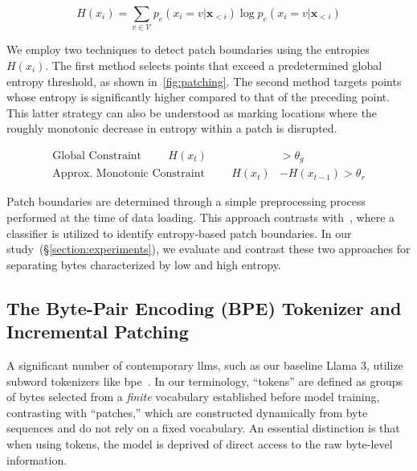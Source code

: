 \begin{equation}
H(x_i) = \sum_{v \in \mathcal{V}} p_{e}(x_i=v|\pmb{x}_{<i}) \log p_{e}(x_i=v|\pmb{x}_{<i})
\end{equation}

We employ two techniques to detect patch boundaries using the entropies $H(x_i)$. The first method selects points that exceed a predetermined global entropy threshold, as shown in~\autoref{fig:patching}. The second method targets points whose entropy is significantly higher compared to that of the preceding point. This latter strategy can also be understood as marking locations where the roughly monotonic decrease in entropy within a patch is disrupted.

\begin{align*}
    \text{Global Constraint}\hspace{1cm}H(x_t)& > \theta_g\\
    \text{Approx. Monotonic Constraint}\hspace{1cm}H(x_t)& - H(x_{t-1}) > \theta_r
\end{align*}

Patch boundaries are determined through a simple preprocessing process performed at the time of data loading. This approach contrasts with~\citet{nawrot-etal-2023-efficient}, where a classifier is utilized to identify entropy-based patch boundaries. In our study~(\S\ref{section:experiments}), we evaluate and contrast these two approaches for separating bytes characterized by low and high entropy.

\subsection{The Byte-Pair Encoding (BPE) Tokenizer and Incremental Patching}
\label{section:incremental-patching}
\label{section:bpe-patch}

A significant number of contemporary llms, such as our baseline Llama 3, utilize subword tokenizers like bpe~\citep{gage1994new, sennrich-etal-2016-neural}. In our terminology, ``tokens'' are defined as groups of bytes selected from a \textit{finite} vocabulary established before model training, contrasting with ``patches,'' which are constructed dynamically from byte sequences and do not rely on a fixed vocabulary. An essential distinction is that when using tokens, the model is deprived of direct access to the raw byte-level information.

